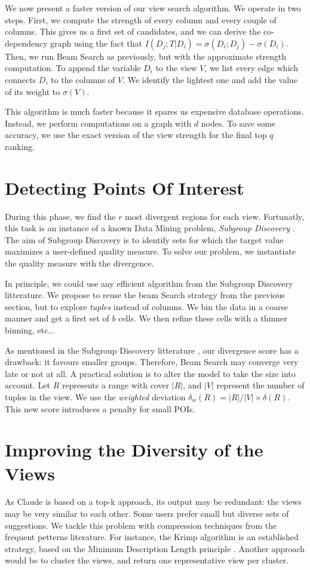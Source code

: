 We now present a faster version of our view search algorithm.  We operate in
two steps. First, we compute the strength of every column and every couple of
columns.  This gives us a first set of candidates, and we can derive the
co-dependency graph using the fact that $I(D_{j} ; T | D_i) = \sigma(D_i ;
D_{j}) - \sigma(D_i)$.  Then, we run Beam Search as previously, but with the
approximate strength computation.  To append the variable $D_i$ to the view
$V$, we list every edge which connects  $D_i$ to the columns of $V$. We
identify the lightest one and add the value of its weight to $\sigma(V)$.  

This algorithm is much faster because it spares us expensive database
operations. Instead, we perform computations on a graph with $d$ nodes.  To
save some accuracy, we use the exact version of the view strength for the final
top $q$ ranking.

\section{Detecting Points Of Interest}
\label{sec:detec}

During this phase, we find the $r$ most divergent regions for each view.
Fortunatly, this task is an instance of a known Data Mining problem,
\emph{Subgroup Discovery} \cite{klosgen1996explora}\cite{wrobel1997algorithm}.
The aim of Subgroup Discovery is to identify sets for which the target value
maximizes a user-defined quality measure. To solve our problem, we instantiate
the quality measure with the divergence.

In principle, we could use any efficient algorithm from the Subgroup Discovery
litterature.  We propose to reuse the beam Search strategy from the previous
section, but to explore \emph{tuples} instead of columns. We bin the data in a
coarse manner and get a first set of $b$ cells. We then refine these cells with
a thinner binning, etc...

As mentioned in the Subgroup Discovery litterature \cite{van2011non}, our
divergence score has a drawback: it favours smaller groups.  Therefore, Beam
Search may converge very late or not at all.  A practical
solution is to alter the model to take the size into account. Let $R$
represents a range with cover $|R|$, and $|V|$ represent the number of tuples
in the view. We use the \emph{weighted} deviation $\delta_w(R) = |R|/|V| \times
\delta(R)$. This new score introduces a penalty for small POIs.


\section{Improving the Diversity of the Views}
As Claude is based on a top-k approach, its output may be redundant: the views
may be very similar to each other.  Some users prefer small but diverse sets of
suggestions.  We tackle this problem with compression techniques from the
frequent petterns literature. For instance, the Krimp algorithm is an
established strategy, based on the Minimum Description Length principle
\cite{vreeken2011krimp}. Another approach would be to cluster the views, and
return one representative view per cluster.


